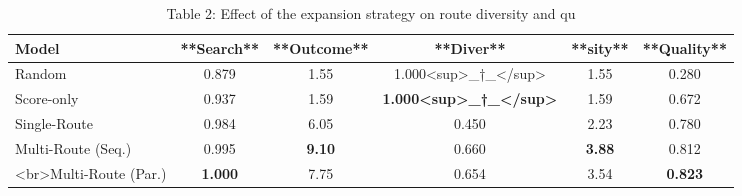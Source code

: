 \begin{table}[t]
\centering
\caption{Table 2: Effect of the expansion strategy on route diversity and qu}
\label{tab:2610.16391}
\begin{tabular}{lccccc}
\toprule
Model & **Search** & **Outcome** & **Diver** & **sity** & **Quality** \\
\midrule
Random & 0.879 & 1.55 & 1.000<sup>\_†\_</sup> & 1.55 & 0.280 \\
Score-only & 0.937 & 1.59 & \textbf{1.000<sup>\_†\_</sup>} & 1.59 & 0.672 \\
Single-Route & 0.984 & 6.05 & 0.450 & 2.23 & 0.780 \\
Multi-Route (Seq.) & 0.995 & \textbf{9.10} & 0.660 & \textbf{3.88} & 0.812 \\
<br>Multi-Route (Par.) & \textbf{1.000} & 7.75 & 0.654 & 3.54 & \textbf{0.823} \\
\bottomrule
\end{tabular}
\end{table}
